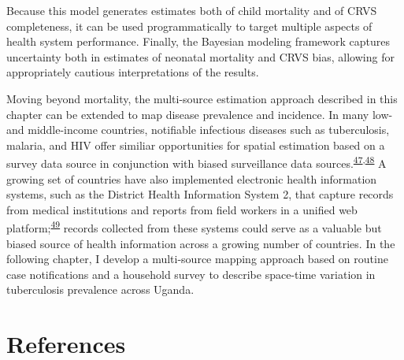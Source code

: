 \documentclass[
]{article}
\begin{document}
Because this model generates estimates both of child mortality and of CRVS completeness, it can be used programmatically to target multiple aspects of health system performance. Finally, the Bayesian modeling framework captures uncertainty both in estimates of neonatal mortality and CRVS bias, allowing for appropriately cautious interpretations of the results.

Moving beyond mortality, the multi-source estimation approach described in this chapter can be extended to map disease prevalence and incidence. In many low- and middle-income countries, notifiable infectious diseases such as tuberculosis, malaria, and HIV offer similiar opportunities for spatial estimation based on a survey data source in conjunction with biased surveillance data sources.\textsuperscript{\protect\hyperlink{ref-Rood2019}{47},\protect\hyperlink{ref-Dwyer-Lindgren2019}{48}} A growing set of countries have also implemented electronic health information systems, such as the District Health Information System 2, that capture records from medical institutions and reports from field workers in a unified web platform;\textsuperscript{\protect\hyperlink{ref-Dehnavieh2019}{49}} records collected from these systems could serve as a valuable but biased source of health information across a growing number of countries. In the following chapter, I develop a multi-source mapping approach based on routine case notifications and a household survey to describe space-time variation in tuberculosis prevalence across Uganda.

\hypertarget{references}{%
\section{References}\label{references}}
\end{document}
